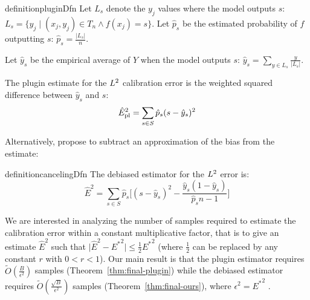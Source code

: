 \begin{restatable}{definition}{pluginDfn}
\label{dfn:plugin-estimator}
  Let $L_s$ denote the $y_j$ values where the model outputs $s$: $L_s = \{ y_j \; | \; (x_j, y_j) \in T_n\wedge f(x_j) = s \}$. Let $\hat{p}_s$ be the estimated probability of $f$ outputting $s$:
$\hat{p}_s = \frac{|L_s|}{n}$.

Let $\hat y_s$ be the empirical average of $Y$ when the model outputs $s$: $\hat y_s = \sum_{y \in L_s} \frac{y}{|L_s|}$.

  The plugin estimate for the $L^2{}$ calibration error is the weighted squared difference between $\hat y_s$ and $s$:
\[ \hat{E}_{\textup{pl}}^2{} = \sum_{s \in S} \hat{p}_s (s - \hat y_s)^2 \]
\end{restatable}

Alternatively, \cite{brocker2012empirical, ferro2012bias} propose to subtract an approximation of the bias from the estimate:

\begin{restatable}{definition}{cancelingDfn}
  The debiased estimator for the $L^2$ error is:
\[ \hat{E}^2 = \sum_{s \in S} \hat{p}_s \Big[ (s - \hat{y}_s)^2 - \frac{\hat{y}_s(1 - \hat{y}_s)}{\hat{p}_sn-1} \Big] \]
\end{restatable}

We are interested in analyzing the number of samples required to estimate the calibration error within a constant multiplicative factor, that is to give an estimate $\hat{E}^2$ such that $\lvert \hat{E}^2 - {E^*}^2 \rvert \leq \frac{1}{2}{E^*}^2$ (where $\frac{1}{2}$ can be replaced by any constant $r$ with $0 < r < 1$). Our main result is that the plugin estimator requires $\widetilde{O}(\frac{B}{\epsilon^2})$ samples (Theorem~\ref{thm:final-plugin}) while the debiased estimator requires $\widetilde{O}(\frac{\sqrt{B}}{\epsilon^2})$ samples (Theorem~\ref{thm:final-ours}), where $\epsilon^2 = {E^*}^2$ .


